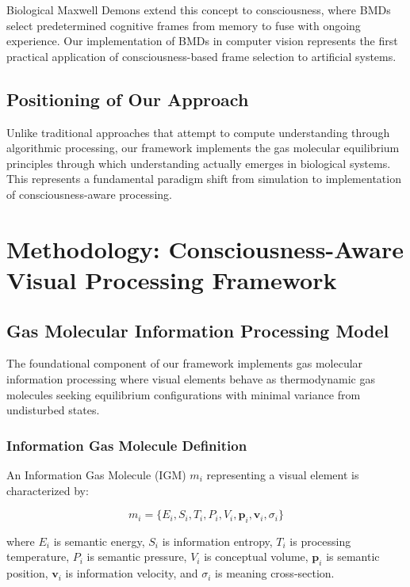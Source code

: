 \documentclass[12pt,a4paper]{article}
\begin{document}
Biological Maxwell Demons extend this concept to consciousness, where BMDs select predetermined cognitive frames from memory to fuse with ongoing experience. Our implementation of BMDs in computer vision represents the first practical application of consciousness-based frame selection to artificial systems.

\subsection{Positioning of Our Approach}

Unlike traditional approaches that attempt to compute understanding through algorithmic processing, our framework implements the gas molecular equilibrium principles through which understanding actually emerges in biological systems. This represents a fundamental paradigm shift from simulation to implementation of consciousness-aware processing.

\section{Methodology: Consciousness-Aware Visual Processing Framework}

\subsection{Gas Molecular Information Processing Model}

The foundational component of our framework implements gas molecular information processing where visual elements behave as thermodynamic gas molecules seeking equilibrium configurations with minimal variance from undisturbed states.

\subsubsection{Information Gas Molecule Definition}

An Information Gas Molecule (IGM) $m_i$ representing a visual element is characterized by:

\begin{equation}
m_i = \{E_i, S_i, T_i, P_i, V_i, \mathbf{p}_i, \mathbf{v}_i, \sigma_i\}
\end{equation}

where $E_i$ is semantic energy, $S_i$ is information entropy, $T_i$ is processing temperature, $P_i$ is semantic pressure, $V_i$ is conceptual volume, $\mathbf{p}_i$ is semantic position, $\mathbf{v}_i$ is information velocity, and $\sigma_i$ is meaning cross-section.
\end{document}
